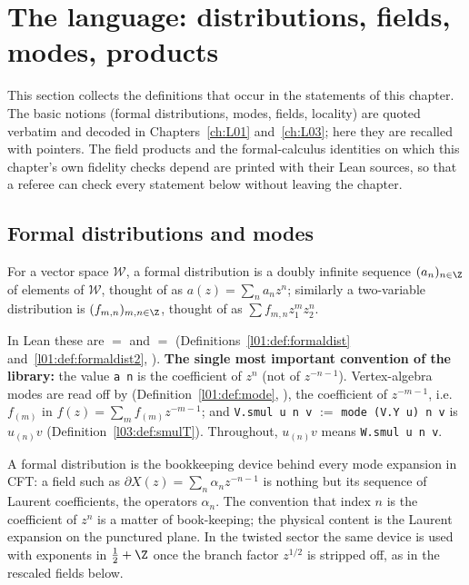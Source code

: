 \section{The language: distributions, fields, modes, products}\label{ch07:sec:language}

This section collects the definitions that occur in the statements of this chapter. The basic
notions (formal distributions, modes, fields, locality) are quoted verbatim and decoded in
Chapters~\ref{ch:L01} and~\ref{ch:L03}; here they are recalled with pointers. The field products
and the formal-calculus identities on which this chapter's own fidelity checks depend are printed
with their Lean sources, so that a referee can check every statement below without leaving the
chapter.

\subsection{Formal distributions and modes}\label{ch07:sec:modes}

\begin{definition}\label{ch07:def:formaldist}
For a vector space $\mathcal W$, a formal distribution is a doubly infinite sequence
$(a_n)_{n\in\Z}$ of elements of $\mathcal W$, thought of as $a(z) = \sum_n a_n z^n$; similarly a
two-variable distribution is $(f_{m,n})_{m,n\in\Z}$, thought of as $\sum f_{m,n}z_1^m z_2^n$.
\end{definition}

In Lean these are  $=$  and  $=$
 (Definitions~\ref{l01:def:formaldist} and~\ref{l01:def:formaldist2},
).
\textbf{The single most important convention of the library:} the value \verb|a n| is the
coefficient of $z^{n}$ (not of $z^{-n-1}$). Vertex-algebra modes are read off by
 (Definition~\ref{l01:def:mode},
), the coefficient of $z^{-m-1}$, i.e.\ $f_{(m)}$ in
$f(z) = \sum_m f_{(m)} z^{-m-1}$; and \verb|V.smul u n v| $:=$ \verb|mode (V.Y u) n v| is
$u_{(n)}v$ (Definition~\ref{l03:def:smulT}). Throughout, $u_{(n)}v$ means \verb|W.smul u n v|.

\begin{physics}
A formal distribution is the bookkeeping device behind every mode expansion in CFT: a field such as $\partial X(z)=\sum_n\alpha_nz^{-n-1}$ is nothing but its sequence of Laurent coefficients, the operators $\alpha_n$. The convention that index $n$ is the coefficient of $z^n$ is a matter of book-keeping; the physical content is the Laurent expansion on the punctured plane. In the twisted sector the same device is used with exponents in $\tfrac12+\Z$ once the branch factor $z^{1/2}$ is stripped off, as in the rescaled fields below.
\end{physics}

